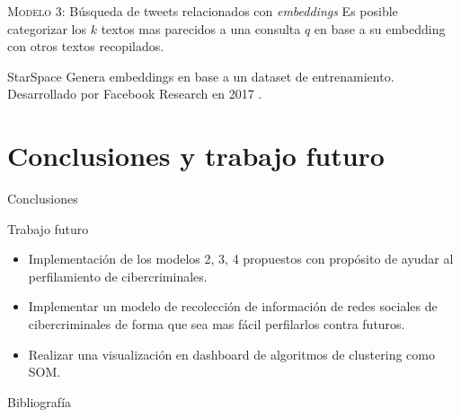 \documentclass[10pt]{beamer}
\begin{document}
\begin{frame}{\textsc{Modelo 3:} Búsqueda de tweets relacionados con \emph{embeddings}}
  Es posible categorizar los $k$ textos mas parecidos a una consulta $q$ en base a su embedding con otros textos recopilados.

  \begin{alertblock}{StarSpace}
    Genera embeddings en base a un dataset de entrenamiento. Desarrollado por Facebook Research en 2017 \cite{starspace}. 
  \end{alertblock}
\end{frame}

\section{Conclusiones y trabajo futuro}

\begin{frame}{Conclusiones}
\end{frame}

\begin{frame}{Trabajo futuro}
  \begin{itemize}
  \item Implementación de los modelos 2, 3, 4 propuestos con propósito de ayudar al perfilamiento de cibercriminales.
  \item Implementar un modelo de recolección de información de redes sociales de cibercriminales de forma que sea mas fácil perfilarlos contra futuros.
  \item Realizar una visualización en dashboard de algoritmos de clustering como \textsc{SOM}.
  \end{itemize}
\end{frame}

\appendix
{}
\begin{frame}[allowframebreaks]{Bibliografía}

  
  

\end{frame}
\end{document}
